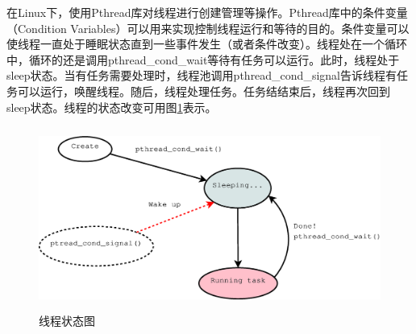 \documentclass[12pt, twoside, a4paper, xetex]{report}
\begin{document}
	在Linux下，使用Pthread库对线程进行创建管理等操作。Pthread库中的条件变量（Condition Variables）可以用来实现控制线程运行和等待的目的。条件变量可以使线程一直处于睡眠状态直到一些事件发生（或者条件改变）。线程处在一个循环中，循环的还是调用pthread\_cond\_wait等待有任务可以运行。此时，线程处于sleep状态。当有任务需要处理时，线程池调用pthread\_cond\_signal告诉线程有任务可以运行，唤醒线程。随后，线程处理任务。任务结结束后，线程再次回到sleep状态。线程的状态改变可用图\ref{tpthread}表示。
	
	\begin{figure}[htbp]
	\centering
	\caption{线程状态图}
	\label{tpthread}
	\includegraphics[height=6cm, width=13cm]{pics/tpthread.eps}
	\end{figure}
	
\end{document}
